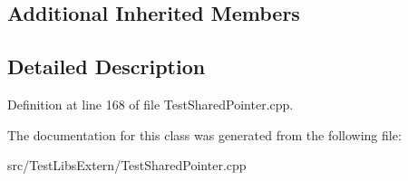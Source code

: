 \subsection*{Additional Inherited Members}


\subsection{Detailed Description}


Definition at line 168 of file Test\+Shared\+Pointer.\+cpp.



The documentation for this class was generated from the following file\+:\begin{DoxyCompactItemize}
\item 
src/\+Test\+Libs\+Extern/Test\+Shared\+Pointer.\+cpp\end{DoxyCompactItemize}
